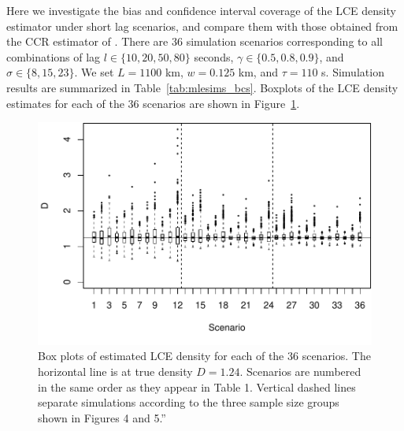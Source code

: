 \documentclass[useAMS, usenatbib, referee]{biom}\usepackage[]{graphicx}\usepackage[]{color}
\makeatletter
\def\maxwidth{ %
  \ifdim\Gin@nat@width>\linewidth
    \linewidth
  \else
    \Gin@nat@width
  \fi
}
\newenvironment{knitrout}{}{} %
\makeatother
\begin{document}
Here we investigate the bias and confidence interval coverage of the LCE density estimator under short lag scenarios, and compare them with those obtained from the CCR estimator of \cite{Stevenson+al:19}. There are 36 simulation scenarios corresponding to all combinations of lag $l \in \{ 10, 20, 50, 80\}$ seconds,  $\gamma \in\{ 0.5, 0.8, 0.9 \}$, and $\sigma\in\{ 8, 15, 23\}$. We set $L = 1100$ km, $w = 0.125$ km, and $\tau = 110$ s. Simulation results are summarized in Table~\ref{tab:mlesims_bcs}. Boxplots of the LCE density estimates for each of the 36 scenarios are shown in Figure~\ref{fig:fig_boxplots_bcs}.


\begin{knitrout}
\color{fgcolor}\begin{figure}

{\centering \includegraphics[width=\maxwidth]{figs/fig_boxplots_bcs-1} 

}

\caption[Box plots of estimated LCE density for each of the 36 scenarios]{Box plots of estimated LCE density for each of the 36 scenarios. The horizontal line is at true density \(D=1.24\). Scenarios are numbered in the same order as they appear in Table 1. Vertical dashed lines separate simulations according to the three sample size groups shown in Figures 4 and 5.”}\label{fig:fig_boxplots_bcs}
\end{figure}


\end{knitrout}
\end{document}
